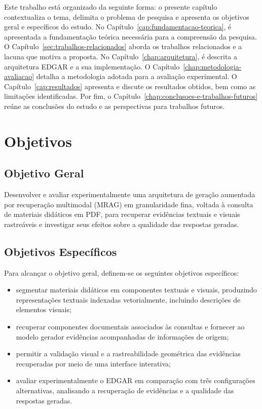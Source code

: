 Este trabalho está organizado da seguinte forma: o presente capítulo contextualiza o tema, delimita o problema de pesquisa e apresenta os objetivos geral e específicos do estudo. No Capítulo~\ref{cap:fundamentacao-teorica}, é apresentada a fundamentação teórica necessária para a compreensão da pesquisa. O Capítulo~\ref{sec:trabalhos-relacionados} aborda os trabalhos relacionados e a lacuna que motiva a proposta. No Capítulo~\ref{chap:arquitetura}, é descrita a arquitetura EDGAR e a sua implementação. O Capítulo~\ref{chap:metodologia-avaliacao} detalha a metodologia adotada para a avaliação experimental. O Capítulo~\ref{cap:resultados} apresenta e discute os resultados obtidos, bem como as limitações identificadas. Por fim, o Capítulo~\ref{chap:conclusoes-e-trabalhos-futuros} reúne as conclusões do estudo e as perspectivas para trabalhos futuros.


\section{Objetivos}
\label{sec:objetivos}

\subsection{Objetivo Geral}
\label{subsec:objetivo_geral}

Desenvolver e avaliar experimentalmente uma arquitetura de geração aumentada por recuperação multimodal (MRAG) em granularidade fina, voltada à consulta de materiais didáticos em PDF, para recuperar evidências textuais e visuais rastreáveis e investigar seus efeitos sobre a qualidade das respostas geradas.

\subsection{Objetivos Específicos}
\label{subsec:objs_especificos}

Para alcançar o objetivo geral, definem-se os seguintes objetivos específicos:

\begin{itemize}
    \item[-] segmentar materiais didáticos em componentes textuais e visuais, produzindo representações textuais indexadas vetorialmente, incluindo descrições de elementos visuais;

    \item[-] recuperar componentes documentais associados às consultas e fornecer ao modelo gerador evidências acompanhadas de informações de origem;

    \item[-] permitir a validação visual e a rastreabilidade geométrica das evidências recuperadas por meio de uma interface interativa;

    \item[-] avaliar experimentalmente o EDGAR em comparação com três configurações alternativas, analisando a recuperação de evidências e a qualidade das respostas geradas.
\end{itemize}
